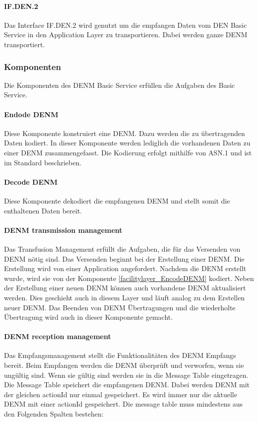 \paragraph{IF.DEN.2}
Das Interface IF.DEN.2 wird genutzt um die empfangen Daten vom \ac{DEN} Basic Service in den Application Layer zu transportieren. Dabei werden ganze \ac{DENM} transportiert.


\subsubsection{Komponenten}
Die Komponenten des \ac{DENM} Basic Service erfüllen die Aufgaben des Basic Service.

\paragraph{Endode DENM \label{facilitylayer_EncodeDENM}}
Diese Komponente konstruiert eine \ac{DENM}. Dazu werden die zu übertragenden Daten kodiert. In dieser Komponente werden lediglich die vorhandenen Daten zu einer \ac{DENM} zusammengefasst. Die Kodierung erfolgt mithilfe von \ac{ASN.1} und ist im Standard \cite{en302637-3} beschrieben. 

\paragraph{Decode DENM}
Diese Komponente dekodiert die empfangenen \ac{DENM} und stellt somit die enthaltenen Daten bereit.

\paragraph{DENM transmission management}
Das Transfusion Management erfüllt die Aufgaben, die für das Versenden von \ac{DENM} nötig sind. Das Versenden beginnt bei der Erstellung einer \ac{DENM}. Die Erstellung wird von einer Application angefordert. Nachdem die \ac{DENM} erstellt wurde, wird sie von der Komponente \ref{facilitylayer_EncodeDENM} kodiert. Neben der Erstellung einer neuen \ac{DENM} können auch vorhandene \ac{DENM} aktualisiert werden. Dies geschieht auch in diesem Layer und läuft analog zu dem Erstellen neuer \ac{DENM}. Das Beenden von \ac{DENM} Übertragungen und die wiederholte Übertragung wird auch in dieser Komponente gemacht.

\paragraph{DENM reception management}
Das Empfangsmanagement stellt die Funktionalitäten des \ac{DENM} Empfangs bereit. Beim Empfangen werden die \ac{DENM} überprüft und verworfen, wenn sie ungültig sind. Wenn sie gültig sind werden sie in die Message Table eingetragen. Die Message Table speichert die empfangenen \ac{DENM}. Dabei werden \ac{DENM} mit der gleichen actionId nur einmal gespeichert. Es wird immer nur die aktuelle \ac{DENM} mit einer actionId gespeichert. Die message table muss mindestens aus den Folgenden Spalten bestehen:


